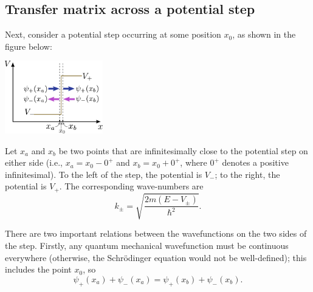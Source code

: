 \documentclass[pra,12pt]{revtex4}
\begin{document}
\subsection{Transfer matrix across a potential step}

Next, consider a potential step occurring at some position $x_0$, as
shown in the figure below:

\begin{center}
  \includegraphics[width=0.32\textwidth]{transfer_step}
\end{center}

Let $x_a$ and $x_b$ be two points that are infinitesimally close to
the potential step on either side (i.e., $x_a = x_0 - 0^+$ and $x_b =
x_0 + 0^+$, where $0^+$ denotes a positive infinitesimal).  To the
left of the step, the potential is $V_-$; to the right, the potential
is $V_+$.  The corresponding wave-numbers are
$$k_\pm = \sqrt{\frac{2m(E-V_\pm)}{\hbar^2}}.$$

There are two important relations between the wavefunctions on the two
sides of the step.  Firstly, any quantum mechanical wavefunction must
be continuous everywhere (otherwise, the Schr\"odinger equation would
not be well-defined); this includes the point $x_0$, so
$$\psi_+(x_a) + \psi_-(x_a) = \psi_+(x_b) + \psi_-(x_b).$$
\end{document}
